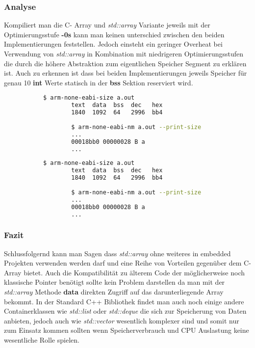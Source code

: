 \documentclass[MES,Master,ngerman]{twbook}%
\begin{document}
\subsubsection{Analyse}
Kompiliert man die C- Array und \textit{std::array} Variante jeweils mit der Optimierungsstufe \textbf{-0s} kann man keinen unterschied zwischen den beiden Implementierungen feststellen. Jedoch einsteht ein geringer Overheat bei Verwendung von \textit{std::array} in Kombination mit niedrigeren Optimierungsstufen die durch die höhere Abstraktion zum eigentlichen Speicher Segment zu erklären ist. Auch zu erkennen ist dass bei beiden Implementierungen jeweils Speicher für genau 10 \textbf{int} Werte statisch in der \textbf{bss} Sektion reserviert wird.


\begin{figure}[!htb]
	\begin{subfigure}[b]{0.5\textwidth}
		\begin{lstlisting}[gobble=6, title={C- Array}, language=bash, numbers=none]
		$ arm-none-eabi-size a.out
		text  data  bss  dec   hex
		1840  1092  64   2996  bb4
		
		$ arm-none-eabi-nm a.out --print-size
		...
		00018bb0 00000028 B a
		...
		\end{lstlisting}
	\end{subfigure}
	\begin{subfigure}[b]{0.5\textwidth}
		\begin{lstlisting}[gobble=6, title={std::array}, language=bash, numbers=none]
		$ arm-none-eabi-size a.out
		text  data  bss  dec   hex
		1840  1092  64   2996  bb4
		
		$ arm-none-eabi-nm a.out --print-size
		...
		00018bb0 00000028 B a
		...
		\end{lstlisting}
	\end{subfigure}
\end{figure}

\subsubsection{Fazit}
Schlussfolgernd kann man Sagen dass \textit{std::array} ohne weiteres in embedded Projekten verwenden werden darf und eine Reihe von Vorteilen gegenüber dem C- Array bietet. Auch die Kompatibilität zu älterem Code der möglicherweise noch klassische Pointer benötigt sollte kein Problem darstellen da man mit der \textit{std::array} Methode \textbf{data} direkten Zugriff auf das darunterliegende Array bekommt. In der Standard C++ Bibliothek findet man auch noch einige andere Containerklassen wie \textit{std::list} oder \textit{std::deque} die sich zur Speicherung von Daten anbieten, jedoch auch wie \textit{std::vector} wesentlich komplexer sind und somit nur zum Einsatz kommen sollten wenn Speicherverbrauch und CPU Auslastung keine wesentliche Rolle spielen.
\newpage
\end{document}
